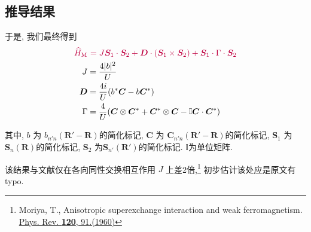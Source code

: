 \documentclass[a4paper, 12pt]{article}
\newcommand{\purple}{\textcolor{purple}}
\begin{document}
\subsection{推导结果}
于是, 我们最终得到
\begin{subequations}
  \begin{align}
    \purple{\widehat{H}_{\text{M}}} &\ \purple{= J\bm{S}_1\cdot\bm{S}_2 + \bm{D}\cdot(\bm{S}_1\times\bm{S}_2) + \bm{S}_1\cdot\Gamma\cdot\bm{S}_2}\\
    J &= \frac{4|b|^2}{U}\\
    \bm{D} &= \frac{4i}{U}(b^*\bm{C}-b\bm{C}^*)\\
    \Gamma &= \frac{4}{U}(\bm{C}\otimes{}\bm{C}^* + \bm{C}^*\otimes{}\bm{C} - \mathbb{I}\bm{C}\cdot{}\bm{C}^*)
  \end{align}
\end{subequations}

其中, \(b\) 为 \(b_{n'n}(\bm{R}'-\bm{R})\)的简化标记, \(\bm{C}\) 为 \(\bm{C}_{n'n}(\bm{R}'-\bm{R})\)的简化标记, \(\bm{S}_1\) 为\(\bm{S}_n(\bm{R})\)的简化标记, \(\bm{S}_2\) 为\(\bm{S}_{n'}(\bm{R}')\)的简化标记. \(\mathbb{I}\)为单位矩阵.

该结果与文献仅在各向同性交换相互作用 \(J\) 上差2倍,\footnote{Moriya, T., Anisotropic superexchange interaction and weak ferromagnetism. \href{https://doi.org/10.1103/PhysRev.120.91}{ Phys. Rev. \textbf{120}, 91.(1960)}} 初步估计该处应是原文有typo.
\end{document}
